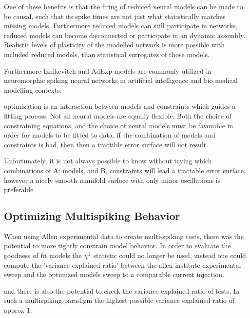 
One of these benefits is that the firing of reduced neural models can be made to be causal, such that its spike times are not just what statistically matches missing models. Furthermore reduced models can still participate in networks, reduced models can become disconnected or participate in an dynamic assembly. Realistic levels of plasticity of the modelled network is more possible with included reduced models, than statistical surrogates of those models.

Furthermore Izhikevitch and AdExp models are commonly utilized in neuromorphic spiking neural networks in artificial intelligence and bio medical modelling contexts.

optimization is an interaction between models and constraints which guides a fitting process. Not all neural models are equally flexible.  
Both the choice of constraining equations, and the choice of neural models must be favorable in order for models to be fitted to data.
if the combination of models and constraints is bad, then then a tractible error surface will not result.  

Unfortunately, it is not always possible to know without trying which combinations of A: models, and B, constraints will lead a tractable error surface, however a nicely smooth manifold surface with only minor oscillations is preferable


\subsection{Optimizing Multispiking Behavior}

When using Allen experimental data to create multi-spiking tests, there was the potential to more tightly constrain model behavior. In order to evaluate the goodness of fit models the $\chi^{2}$ statistic could no longer be used, instead one could compute the 'variance explained ratio' between the allen institute experimental sweep and the optimized models sweep to a comparable current injection.

and there is also the potential to check the variance explained ratio of tests. In such a multispiking paradigm the highest possible variance explained ratio of approx $1$. 


